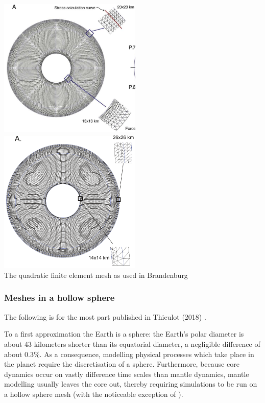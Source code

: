 \begin{center}
\includegraphics[width=6.8cm]{images/meshes/brhv08}
\includegraphics[width=6.8cm]{images/meshes/brva07a}\\
{\captionfont The quadratic finite element mesh as used in 
Brandenburg \etal \cite{brhv08,brva07a}}
\end{center}


\subsubsection{Meshes in a hollow sphere}

The following is for the most part published in Thieulot (2018) \cite{thie18}.

To a first approximation the Earth is a sphere: the Earth's polar diameter is about 43 kilometers shorter 
than its equatorial diameter, a negligible difference of about 0.3\%. As a consequence, modelling physical processes 
which take place in the planet require the discretisation of a sphere. 
Furthermore, because core dynamics occur on vastly difference time scales than mantle dynamics, mantle 
modelling usually leaves the core out, thereby requiring simulations to be run on a hollow sphere mesh
(with the noticeable exception of \cite{geyu07}).

